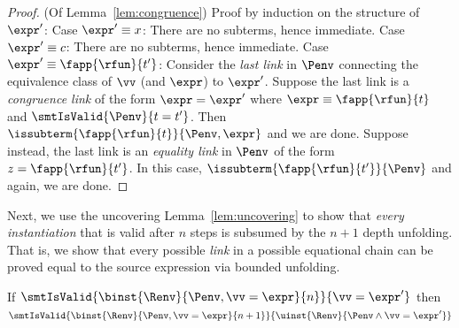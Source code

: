 \begin{proof} (Of Lemma~\ref{lem:congruence})
%
Proof by induction on the structure of $\expr'$:
%
Case $\expr' \equiv x$:
  There are no subterms, hence immediate.
%
Case $\expr' \equiv c$:
  There are no subterms, hence immediate.
%
Case $\expr' \equiv \fapp{\rfun}{t'}$:
  Consider the \emph{last link} in $\Penv$
  connecting the equivalence class
  of $\vv$ (and $\expr$) to $\expr'$.
  Suppose the last link is a \emph{congruence link}
  of the form $\expr = \expr'$ where
  $\expr \equiv \fapp{\rfun}{t}$ and
  $\smtIsValid{\Penv}{t = t'}$.
  Then $\issubterm{\fapp{\rfun}{t}}{\Penv, \expr}$
  and we are done.
  Suppose instead, the last link is an \emph{equality link}
  in $\Penv$ of the form $z = \fapp{\rfun}{t'}$.
  In this case, $\issubterm{\fapp{\rfun}{t'}}{\Penv}$
  and again, we are done.
\end{proof}

%
Next, we use the uncovering Lemma~\ref{lem:uncovering}
to show that \emph{every instantiation} that is valid
after $n$ steps is subsumed by the $n+1$ depth unfolding.
%
That is, we show that every possible \emph{link} in
a possible equational chain can be proved equal to
the source expression via bounded unfolding.

\begin{lemma} \label{lem:link}
If   $\smtIsValid{\binst{\Renv}{\Penv, \vv = \expr}{n}}{\vv = \expr'}$
then $\smtIsValid{\binst{\Renv}{\Penv, \vv = \expr}{n+1}}{\uinst{\Renv}{\Penv \wedge \vv = \expr'}}$
\end{lemma}

